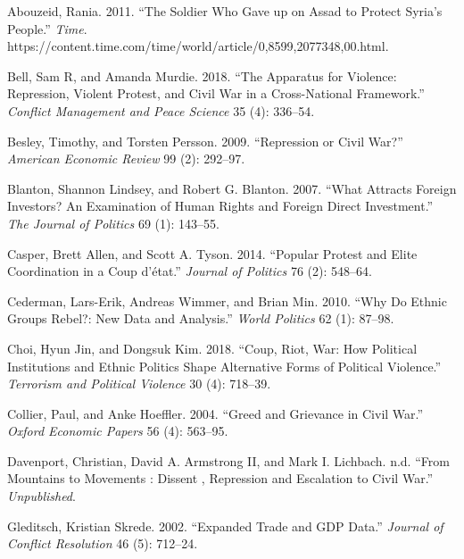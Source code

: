 \documentclass[12pt,]{article}
\theoremstyle{definition}
\theoremstyle{definition}
\theoremstyle{definition}
\theoremstyle{remark}
\begin{document}

\indent

\setlength{\parindent}{-0.2in}
\setlength{\leftskip}{0.2in}
\setlength{\parskip}{8pt}

\singlespacing

\hypertarget{refs}{}
\leavevmode\hypertarget{ref-Abouzeid2011}{}%
Abouzeid, Rania. 2011. ``The Soldier Who Gave up on Assad to Protect
Syria's People.'' \emph{Time}.
https://content.time.com/time/world/article/0,8599,2077348,00.html.

\leavevmode\hypertarget{ref-Bell2018}{}%
Bell, Sam R, and Amanda Murdie. 2018. ``The Apparatus for Violence:
Repression, Violent Protest, and Civil War in a Cross-National
Framework.'' \emph{Conflict Management and Peace Science} 35 (4):
336--54.

\leavevmode\hypertarget{ref-Besley2009}{}%
Besley, Timothy, and Torsten Persson. 2009. ``Repression or Civil War?''
\emph{American Economic Review} 99 (2): 292--97.

\leavevmode\hypertarget{ref-Blanton2007}{}%
Blanton, Shannon Lindsey, and Robert G. Blanton. 2007. ``What Attracts
Foreign Investors? An Examination of Human Rights and Foreign Direct
Investment.'' \emph{The Journal of Politics} 69 (1): 143--55.

\leavevmode\hypertarget{ref-Casper2014}{}%
Casper, Brett Allen, and Scott A. Tyson. 2014. ``Popular Protest and
Elite Coordination in a Coup d'état.'' \emph{Journal of Politics} 76
(2): 548--64.

\leavevmode\hypertarget{ref-Cederman2010}{}%
Cederman, Lars-Erik, Andreas Wimmer, and Brian Min. 2010. ``Why Do
Ethnic Groups Rebel?: New Data and Analysis.'' \emph{World Politics} 62
(1): 87--98.

\leavevmode\hypertarget{ref-Choi2018}{}%
Choi, Hyun Jin, and Dongsuk Kim. 2018. ``Coup, Riot, War: How Political
Institutions and Ethnic Politics Shape Alternative Forms of Political
Violence.'' \emph{Terrorism and Political Violence} 30 (4): 718--39.

\leavevmode\hypertarget{ref-Collier2004}{}%
Collier, Paul, and Anke Hoeffler. 2004. ``Greed and Grievance in Civil
War.'' \emph{Oxford Economic Papers} 56 (4): 563--95.

\leavevmode\hypertarget{ref-Davenportnd}{}%
Davenport, Christian, David A. Armstrong II, and Mark I. Lichbach. n.d.
``From Mountains to Movements : Dissent , Repression and Escalation to
Civil War.'' \emph{Unpublished}.

\leavevmode\hypertarget{ref-Gleditsch2002a}{}%
Gleditsch, Kristian Skrede. 2002. ``Expanded Trade and GDP Data.''
\emph{Journal of Conflict Resolution} 46 (5): 712--24.
\end{document}
